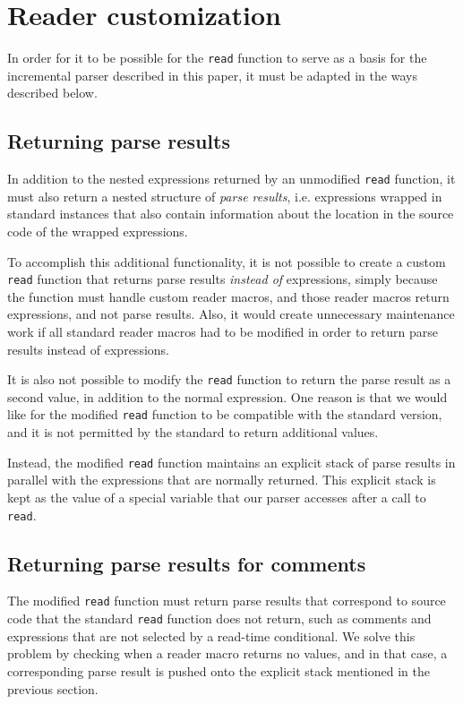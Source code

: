 \section{Reader customization}
\label{app-reader-customization}

In order for it to be possible for the \commonlisp{} \texttt{read}
function to serve as a basis for the incremental parser described in
this paper, it must be adapted in the ways described below.

\subsection{Returning parse results}

In addition to the nested expressions returned by an unmodified
\texttt{read} function, it must also return a nested structure of
\emph{parse results}, i.e. expressions wrapped in standard instances
that also contain information about the location in the source code of
the wrapped expressions.

To accomplish this additional functionality, it is not possible to
create a custom \texttt{read} function that returns parse results
\emph{instead of} expressions, simply because the function must handle
custom reader macros, and those reader macros return expressions, and
not parse results.  Also, it would create unnecessary maintenance work
if all standard reader macros had to be modified in order to return
parse results instead of expressions.

It is also not possible to modify the \texttt{read} function to return
the parse result as a second value, in addition to the normal
expression.  One reason is that we would like for the modified
\texttt{read} function to be compatible with the standard version, and
it is not permitted by the \commonlisp{} standard to return additional
values.

Instead, the modified \texttt{read} function maintains an explicit
stack of parse results in parallel with the expressions that are
normally returned.  This explicit stack is kept as the value of a
special variable that our parser accesses after a call to
\texttt{read}.

\subsection{Returning parse results for comments}

The modified \texttt{read} function must return parse results that
correspond to source code that the standard \texttt{read} function
does not return, such as comments and expressions that are not
selected by a read-time conditional.  We solve this problem by
checking when a reader macro returns no values, and in that case, a
corresponding parse result is pushed onto the explicit stack mentioned
in the previous section.

